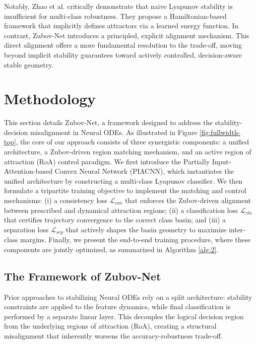 \documentclass[journal]{IEEEtran}
\begin{document}
Notably, Zhao et al. \cite{NEURIPS2023_0a443a00} critically demonstrate that naive Lyapunov stability is insufficient for multi-class robustness. They propose a Hamiltonian-based framework that implicitly defines attractors via a learned energy function.  In contrast, Zubov-Net introduces a principled, explicit alignment mechanism. This direct alignment offers a more fundamental resolution to the trade-off, moving beyond implicit stability guarantees toward actively controlled, decision-aware stable geometry.

\section{Methodology}\label{sec:3}

This section details Zubov-Net, a framework designed to address the stability-decision misalignment in Neural ODEs. As illustrated in Figure \ref{fig:fullwidth-top}, the core of our approach consists of three synergistic components: a unified architecture, a Zubov-driven region matching mechanism, and an active region of attraction (RoA) control paradigm. We first introduce the Partially Input-Attention-based Convex Neural Network (PIACNN), which instantiates the unified architecture by constructing a multi-class Lyapunov classifier. We then formulate a tripartite training objective to implement the matching and control mechanisms: (i) a consistency loss $\mathcal{L}_{con}$ that enforces the Zubov-driven alignment between prescribed and dynamical attraction regions; (ii) a classification loss $\mathcal{L}_{cla}$ that certifies trajectory convergence to the correct class basin; and (iii) a separation loss $\mathcal{L}_{sep}$ that actively shapes the basin geometry to maximize inter-class margins. Finally, we present the end-to-end training procedure, where these components are jointly optimized, as summarized in Algorithm \ref{alg:2}.



\subsection{The Framework of Zubov-Net}\label{sec:merhods_A}
Prior approaches to stabilizing Neural ODEs rely on a split architecture: stability constraints are applied to the feature dynamics, while final classification is performed by a separate linear layer.  This decouples the logical decision region from the underlying regions of attraction (RoA), creating a structural misalignment that inherently worsens the accuracy-robustness trade-off.
\end{document}
